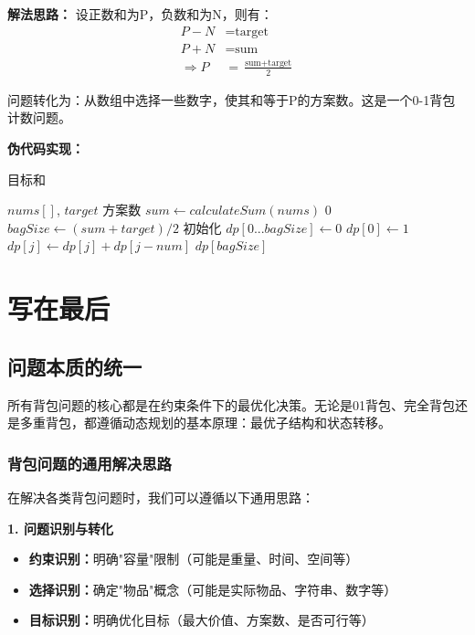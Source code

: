 \textbf{解法思路：}
设正数和为P，负数和为N，则有：
\begin{align}
P - N &= \text{target} \\
P + N &= \text{sum} \\
\Rightarrow P &= \frac{\text{sum} + \text{target}}{2}
\end{align}

问题转化为：从数组中选择一些数字，使其和等于P的方案数。这是一个0-1背包计数问题。

\textbf{伪代码实现：}
\begin{algorithm}
\caption{目标和}
\begin{algorithmic}[1]
\REQUIRE $nums[]$, $target$
\ENSURE 方案数
\STATE $sum \leftarrow calculateSum(nums)$
    \RETURN $0$
\ENDIF
\STATE $bagSize \leftarrow (sum + target) / 2$
\STATE 初始化 $dp[0...bagSize] \leftarrow 0$
\STATE $dp[0] \leftarrow 1$
        \STATE $dp[j] \leftarrow dp[j] + dp[j - num]$
    \ENDFOR
\ENDFOR
\RETURN $dp[bagSize]$
\end{algorithmic}
\end{algorithm}

\section{写在最后}

\subsection{问题本质的统一}
所有背包问题的核心都是在约束条件下的最优化决策。无论是01背包、完全背包还是多重背包，都遵循动态规划的基本原理：最优子结构和状态转移。

\subsubsection{背包问题的通用解决思路}

在解决各类背包问题时，我们可以遵循以下通用思路：

\textbf{1. 问题识别与转化}
\begin{itemize}
\item \textbf{约束识别：}明确"容量"限制（可能是重量、时间、空间等）
\item \textbf{选择识别：}确定"物品"概念（可能是实际物品、字符串、数字等）
\item \textbf{目标识别：}明确优化目标（最大价值、方案数、是否可行等）
\end{itemize}

